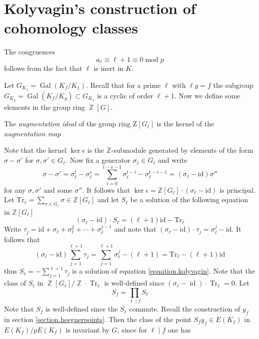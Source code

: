 \documentclass[paper=a4, fontsize=11pt]{scrartcl}
\DeclareMathOperator{\id}{\text{id}}
\DeclareMathOperator{\Gal}{\text{Gal}}
\DeclareMathOperator{\Tr}{\text{Tr}}
\DeclareMathOperator{\Z}{\mathbb{Z}}
\DeclareMathOperator{\mmm}{\text{ mod }}
\numberwithin{equation}{section}
\numberwithin{figure}{section}
\numberwithin{table}{section}
\begin{document}
\section{Kolyvagin's construction of cohomology classes}
The congruences
$$a_\ell\equiv\ell+1\equiv 0\mmm p$$
follows from the fact that $\ell$ is inert in $K$.\par %
Let $G_{K_1}=\Gal(K_f/K_1)$. Recall that for a prime $\ell$ with $\ell g=f$ the subgroup $G_{K_g}=\Gal(K_f/K_g)\subset G_{K_1}$ is a cyclic of order $\ell+1$. Now we define some elements in the group ring $\Z[G]$.\par The \textit{augmentation ideal} of the group ring Z$[G_\ell]$ is the kernel of the \textit{augmentation map}
\begin{center}
\end{center}
Note that the kernel $\ker \epsilon$ is the $\mathbb{Z}$-submodule generated by elements of the form $\sigma-\sigma'$ for $\sigma,\sigma'\in G_\ell$. Now fix a generator $\sigma_\ell\in G_\ell$ and write
$$\sigma-\sigma'=\sigma_\ell^t-\sigma_\ell^s=\sum_{i=0}^{t-s-1}\sigma_\ell^{t-i}-\sigma_\ell^{t-i-1}=(\sigma_\ell-\text{id})\sigma''$$
for any $\sigma,\sigma'$ and some $\sigma''$. It follows that $\ker\epsilon=\mathbb{Z}[G_\ell]\cdot (\sigma_\ell-\text{id})$ is principal. Let $\text{Tr}_\ell=\sum_{\sigma\in G_\ell}\sigma\in \mathbb{Z}[G_\ell]$ and let $S_\ell$ be a solution of the following equation in $\mathbb{Z}[G_\ell]$
\begin{equation}\label{equation.kolyvagin}
	(\sigma_\ell-\text{id})\cdot S_\ell=(\ell+1)\text{id}-\text{Tr}_\ell
\end{equation}
Write $\tau_j=\text{id}+\sigma_\ell+\sigma_\ell^2+\cdots+\sigma_\ell^{j-1}$ and note that $(\sigma_\ell-\text{id})\cdot \tau_j=\sigma_\ell^j-\text{id}$. It follows that
$$(\sigma_\ell-\text{id})\sum_{j=1}^{\ell+1} \tau_j=\sum_{j=1}^{\ell+1} \sigma_\ell^j-(\ell+1)=\text{Tr}_\ell-(\ell+1)\text{id}$$
thus $S_\ell=-\sum_{j=1}^{\ell+1} \tau_j$ is a solution of equation \ref{equation.kolyvagin}. 
Note that the class of $S_\ell$ in $\Z[G_\ell]/\Z\cdot \Tr_\ell$ is well-defined since $(\sigma_\ell-\id)\cdot \Tr_\ell=0$. Let
$$S_f=\prod_{\ell\mid f}S_\ell$$
Note that $S_f$ is well-defined since the $S_\ell$ commute. Recall the construction of $y_f$ in section \ref{section.heegnerpoints}. Then the class of the point $S_f y_f\in E(K_f)$ in $E(K_f)/pE(K_f)$ is invariant by $G$, since for $\ell\mid f$ one has
\end{document}
